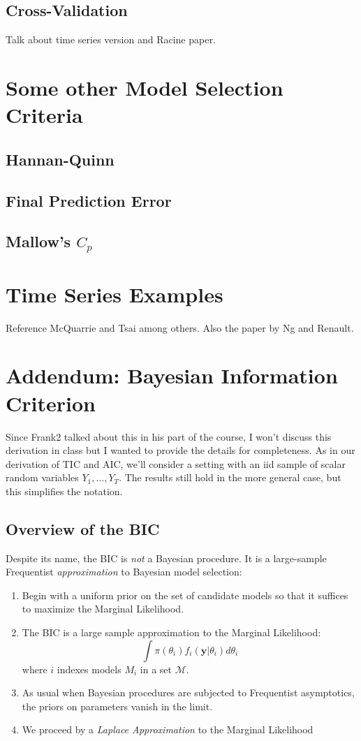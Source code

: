 \documentclass[12pt]{article}
\theoremstyle{definition}
\begin{document}
\subsection{Cross-Validation}
Talk about time series version and Racine paper.

\section{Some other Model Selection Criteria}
\subsection{Hannan-Quinn}
\subsection{Final Prediction Error}
\subsection{Mallow's $C_p$}




\section{Time Series Examples}
Reference McQuarrie and Tsai among others. Also the paper by Ng and Renault. 

\newpage

\section*{Addendum: Bayesian Information Criterion}
Since Frank2 talked about this in his part of the course, I won't discuss this derivation in class but I wanted to provide the details for completeness. As in our derivation of TIC and AIC, we'll consider a setting with an iid sample of scalar random variables $Y_1, \hdots, Y_T$. The results still hold in the more general case, but this simplifies the notation. 

\subsection{Overview of the BIC}
Despite its name, the BIC is \emph{not} a Bayesian procedure. It is a large-sample Frequentist \emph{approximation} to Bayesian model selection:
	\begin{enumerate}
		\item Begin with a uniform prior on the set of candidate models so that it suffices to maximize the Marginal Likelihood.
		\item The BIC is a large sample approximation to the Marginal Likelihood:
		$$\int \pi(\theta_i)f_i(\mathbf{y}|\theta_i)d\theta_i$$
		where $i$ indexes models $M_i$ in a set $\mathcal{M}$.
		\item As usual when Bayesian procedures are subjected to Frequentist asymptotics, the priors on parameters vanish in the limit.
		\item We proceed by a \emph{Laplace Approximation} to the Marginal Likelihood
	\end{enumerate}
\end{document}
